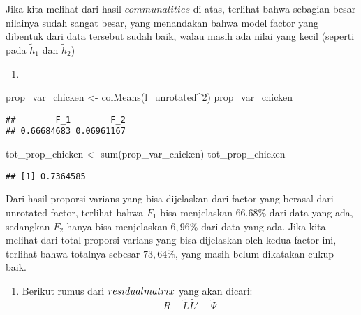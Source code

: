 \documentclass[
]{article}
\newenvironment{Shaded}{\begin{snugshade}}{\end{snugshade}}
\newcommand{\DecValTok}[1]{\textcolor[rgb]{0.00,0.00,0.81}{#1}}
\newcommand{\FunctionTok}[1]{\textcolor[rgb]{0.00,0.00,0.00}{#1}}
\newcommand{\NormalTok}[1]{#1}
\newcommand{\OtherTok}[1]{\textcolor[rgb]{0.56,0.35,0.01}{#1}}
\newcommand{\SpecialCharTok}[1]{\textcolor[rgb]{0.00,0.00,0.00}{#1}}
\providecommand{\tightlist}{%
  \setlength{\itemsep}{0pt}\setlength{\parskip}{0pt}}
\begin{document}
Jika kita melihat dari hasil \(communalities\) di atas, terlihat bahwa
sebagian besar nilainya sudah sangat besar, yang menandakan bahwa model
factor yang dibentuk dari data tersebut sudah baik, walau masih ada
nilai yang kecil (seperti pada \(\tilde{h}_{1}\) dan \(\tilde{h}_{2}\))

\begin{enumerate}
\def\labelenumi{\alph{enumi}.}
\setcounter{enumi}{2}
\tightlist
\item
\end{enumerate}

\begin{Shaded}
\begin{Highlighting}[]
\NormalTok{prop\_var\_chicken }\OtherTok{\textless{}{-}} \FunctionTok{colMeans}\NormalTok{(l\_unrotated}\SpecialCharTok{\^{}}\DecValTok{2}\NormalTok{)}
\NormalTok{prop\_var\_chicken}
\end{Highlighting}
\end{Shaded}

\begin{verbatim}
##        F_1        F_2 
## 0.66684683 0.06961167
\end{verbatim}

\begin{Shaded}
\begin{Highlighting}[]
\NormalTok{tot\_prop\_chicken }\OtherTok{\textless{}{-}} \FunctionTok{sum}\NormalTok{(prop\_var\_chicken)}
\NormalTok{tot\_prop\_chicken}
\end{Highlighting}
\end{Shaded}

\begin{verbatim}
## [1] 0.7364585
\end{verbatim}

Dari hasil proporsi varians yang bisa dijelaskan dari factor yang
berasal dari unrotated factor, terlihat bahwa \(F_{1}\) bisa menjelaskan
\(66.68\%\) dari data yang ada, sedangkan \(F_{2}\) hanya bisa
menjelaskan \(6,96\%\) dari data yang ada. Jika kita melihat dari total
proporsi varians yang bisa dijelaskan oleh kedua factor ini, terlihat
bahwa totalnya sebesar \(73,64\%\), yang masih belum dikatakan cukup
baik.

\begin{enumerate}
\def\labelenumi{\alph{enumi}.}
\setcounter{enumi}{3}
\tightlist
\item
  Berikut rumus dari \(residual \space matrix\) yang akan dicari:
  \[R - \tilde{L}\tilde{L'} - \tilde{\Psi}\]
\end{enumerate}
\end{document}
